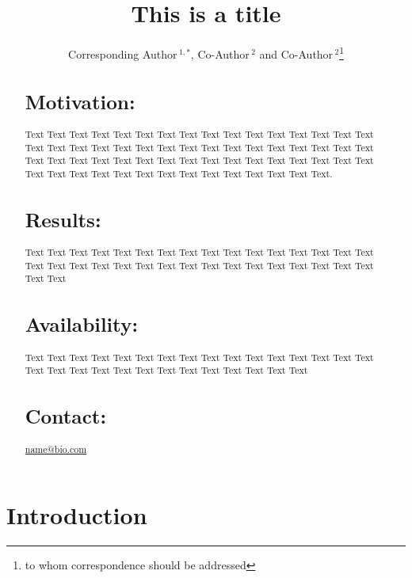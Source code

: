 \documentclass{bioinfo}
\begin{document}

\title[short Title]{This is a title}
\author[Sample \textit{et~al}]{Corresponding Author\,$^{1,*}$, Co-Author\,$^{2}$ and Co-Author\,$^2$\footnote{to whom correspondence should be addressed}}
\address{$^{1}$Department of XXXXXXX, Address XXXX etc.\\
$^{2}$Department of XXXXXXXX, Address XXXX etc.}



\maketitle

\begin{abstract}

\section{Motivation:}
Text Text Text  Text Text Text Text Text Text Text Text
Text  Text Text Text Text Text Text Text Text Text  Text Text Text Text Text Text Text Text Text  Text Text Text Text Text Text Text Text Text  Text Text Text Text Text Text Text Text Text  Text Text Text Text Text Text Text Text Text  Text Text Text Text Text.

\section{Results:}
Text  Text Text Text Text Text Text Text Text Text  Text Text Text Text Text Text Text Text Text  Text Text Text Text Text Text Text Text Text  Text Text Text Text Text Text

\section{Availability:}
Text  Text Text Text Text Text Text Text Text Text  Text Text Text Text Text Text Text Text Text  Text Text Text Text Text Text Text Text Text  Text

\section{Contact:} \href{name@bio.com}{name@bio.com}
\end{abstract}

\section{Introduction}
\end{document}
